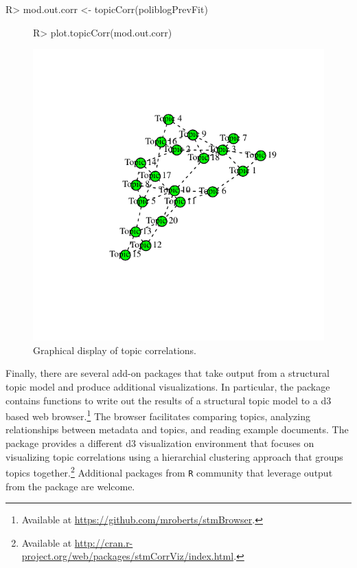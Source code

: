 \documentclass[article,shortnames]{jss}
\begin{document}
\begin{Schunk}
\begin{Sinput}
R> mod.out.corr <- topicCorr(poliblogPrevFit)
\end{Sinput}
\end{Schunk}

\begin{figure}
\vspace{-20pt}
\begin{center}
\begin{Schunk}
\begin{Sinput}
R> plot.topicCorr(mod.out.corr)
\end{Sinput}
\end{Schunk}
\includegraphics{stmVignette-026}
\caption{Graphical display of topic correlations.}
\label{fig:correlations}
\end{center}
\vspace{-20pt}
\end{figure}


Finally, there are several add-on packages that take output from a structural topic model and produce additional visualizations. In particular, the  package contains functions to write out the results of a structural topic model to a d3 based web browser.\footnote{Available at \href{https://github.com/mroberts/stmBrowser}{https://github.com/mroberts/stmBrowser}.} The browser facilitates comparing topics, analyzing relationships between metadata and topics, and reading example documents. The  package provides a different d3 visualization environment that focuses on visualizing topic correlations using a hierarchial clustering approach that groups topics together.\footnote{Available at \href{http://cran.r-project.org/web/packages/stmCorrViz/index.html}{http://cran.r-project.org/web/packages/stmCorrViz/index.html}.} Additional packages from \texttt{R} community that leverage output from the  package are welcome.
\FloatBarrier
\end{document}
